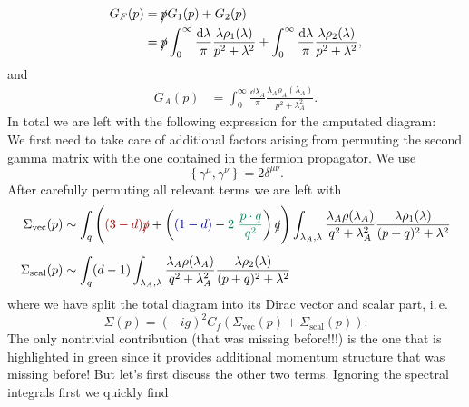 \documentclass[digital, %
			   openright, %
			   parskip=half,
			   11pt]{mythesis}
\begin{document}
\begin{equation}
\begin{aligned}
G_F(p) &=\slashed{p} G_{1}(p)+G_{2}(p)  \\
&= \slashed{p} \int_{0}^{\infty} \frac{\dd \lambda}{\pi} \frac{\lambda\rho_{1}(\lambda)}{p^{2}+\lambda^2}+\int_{0}^{\infty} \frac{\dd \lambda}{\pi} \frac{\lambda\rho_{2}(\lambda)}{p^{2}+\lambda^2},
\end{aligned}
\end{equation}
and
\begin{align} 
G_A(p)&=\int_{0}^{\infty} \frac{\dd \lambda_A}{\pi} \frac{\lambda_A\rho_A(\lambda_A)}{p^{2}+\lambda_A^{2}}.
\end{align}
In total we are left with the following expression for the amputated diagram:\\
\color{MScRed}  We first need to take care of additional factors arising from permuting the second gamma matrix with the one contained in the fermion propagator. We use
\begin{equation}
	\left\{ \gamma^{\mu},\gamma^{\nu}\right\} = 2\delta^{\mu\nu}.
\end{equation} \newpage
\normalcolor
After carefully permuting all relevant terms we are left with 
\begin{equation}
	\begin{aligned}
		\Sigma_{\mathrm{vec}}(p) &\sim \int_q \left(\color{MScRed}(3-d)\slashed{p}\normalcolor + \left(\color{MScBlue}(1-d)\normalcolor - \color{MScGreen}2\ \frac{p\cdot q}{q^2}\normalcolor\right)\slashed{q}\right)\int_{\lambda_A,\lambda} \frac{\lambda_A\rho(\lambda_A)}{q^2 + \lambda_A^2} \frac{\lambda\rho_1(\lambda)}{(p+q)^2 + \lambda^2} \\[0.5em]
		\Sigma_{\mathrm{scal}}(p) &\sim \int_q (d-1)\int_{\lambda_A,\lambda} \frac{\lambda_A\rho(\lambda_A)}{q^2 + \lambda_A^2} \frac{\lambda\rho_2(\lambda)}{(p+q)^2 + \lambda^2}
	\end{aligned}
\end{equation}
where we have split the total diagram into its Dirac vector and scalar part, i.\,e.
\begin{equation}
	\Sigma(p) = (-ig)^2 C_f \left(\Sigma_{\mathrm{vec}}(p) + \Sigma_{\mathrm{scal}}(p)  \right).
\end{equation}
The only nontrivial contribution (that was missing before!!!) is the one that is highlighted in green since it provides additional momentum structure that was missing before! But let's first discuss the other two terms. Ignoring the spectral integrals first we quickly find
\end{document}
